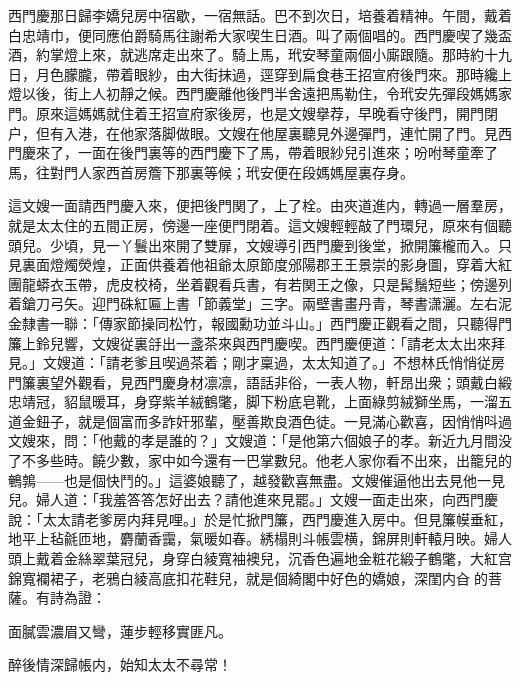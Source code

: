 西門慶那日歸李嬌兒房中宿歇，一宿無話。巴不到次日，培養着精神。午間，戴着白忠靖巾，便同應伯爵騎馬往謝希大家喫生日酒。叫了兩個唱的。西門慶喫了幾盃酒，約掌燈上來，就逃席走出來了。騎上馬，玳安琴童兩個小廝跟隨。那時約十九日，月色朦朧，帶着眼紗，由大街抹過，逕穿到扁食巷王招宣府後門來。那時纔上燈以後，街上人初靜之候。西門慶離他後門半舍遠把馬勒住，令玳安先彈段媽媽家門。原來這媽媽就住着王招宣府家後房，也是文嫂擧荐，早晚看守後門，開門閉户，但有入港，在他家落脚做眼。文嫂在他屋裏聽見外邊彈門，連忙開了門。見西門慶來了，一面在後門裏等的西門慶下了馬，帶着眼紗兒引進來；吩咐琴童牽了馬，往對門人家西首房簷下那裏等候；玳安便在段媽媽屋裏存身。

這文嫂一面請西門慶入來，便把後門関了，上了栓。由夾道進内，轉過一層羣房，就是太太住的五間正房，傍邊一座便門閉着。這文嫂輕輕敲了門環兒，原來有個聽頭兒。少頃，見一丫鬟出來開了雙扉，文嫂導引西門慶到後堂，掀開簾櫳而入。只見裏面燈燭熒煌，正面供養着他祖爺太原節度邠陽郡王王景崇的影身圖，穿着大紅團龍蟒衣玉帶，虎皮校椅，坐着觀看兵書，有若関王之像，只是髯鬚短些；傍邊列着鎗刀弓矢。迎門硃紅匾上書「節義堂」三字。兩壁書畫丹青，琴書潇灑。左右泥金隸書一聯：「傳家節操同松竹，報國勳功並斗山。」西門慶正觀看之間，只聽得門簾上鈴兒響，文嫂従裏㧱出一盞茶來與西門慶喫。西門慶便道：「請老太太出來拜見。」文嫂道：「請老爹且喫過茶着；剛才稟過，太太知道了。」不想林氏悄悄従房門簾裏望外觀看，見西門慶身材凛凛，語話非俗，一表人物，軒昂出衆；頭戴白緞忠靖冠，貂鼠暖耳，身穿紫羊絨鶴氅，脚下粉底皂靴，上面綠剪絨獅坐馬，一溜五道金鈕子，就是個富而多詐奸邪輩，壓善欺良酒色徒。一見滿心歡喜，因悄悄呌過文嫂來，問：「他戴的孝是誰的？」文嫂道：「是他第六個娘子的孝。新近九月間没了不多些時。饒少數，家中如今還有一巴掌數兒。他老人家你看不出來，出籠兒的鵪鶉——也是個快鬥的。」這婆娘聽了，越發歡喜無盡。文嫂催逼他出去見他一見兒。婦人道：「我羞答答怎好出去？請他進來見罷。」文嫂一面走出來，向西門慶說：「太太請老爹房内拜見哩。」於是忙掀門簾，西門慶進入房中。但見簾幙垂紅，地平上毡毹匝地，麝蘭香靄，氣暖如春。綉榻則斗帳雲横，錦屏則軒轅月映。婦人頭上戴着金絲翠葉冠兒，身穿白綾寬袖襖兒，沉香色遍地金粧花緞子鶴氅，大紅宫錦寬襴裙子，老鴉白綾高底扣花鞋兒，就是個綺閣中好色的嬌娘，深閨内㒲𣭈的菩薩。有詩為證：

\begin{myquote}
面膩雲濃眉又彎，蓮步輕移實匪凡。

醉後情深歸帳内，始知太太不尋常！
\end{myquote}

